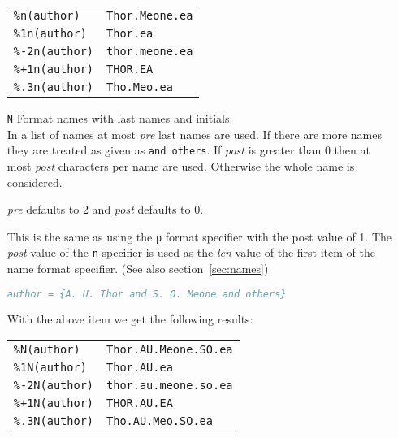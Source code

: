 \documentclass[11pt,a4paper]{scrbook}
\begin{document}
\begin{itemize}
\begin{Example}
      \begin{tabular}{ll}
        \texttt{\%n(author)}	& \texttt{Thor.Meone.ea}	\\
        \texttt{\%1n(author)}	& \texttt{Thor.ea}		\\
        \texttt{\%-2n(author)}	& \texttt{thor.meone.ea}	\\
        \texttt{\%+1n(author)}	& \texttt{THOR.EA}		\\
        \texttt{\%.3n(author)}	& \texttt{Tho.Meo.ea}		
      \end{tabular}
    \end{Example}

  \item [\texttt{N}] Format names with last names and 
    initials.\\
    In a list of names at most \textit{pre} last names are used. If there are
    more names they are treated as given as \texttt{and others}. If
    \textit{post} is greater than 0 then at most \textit{post} characters per
    name are used. Otherwise the whole name is considered.

    \textit{pre} defaults to 2 and \textit{post} defaults to 0.

    This is the same as using the \texttt{p} format specifier with the post
    value of 1. The \textit{post} value of the \texttt{n} specifier is used as
    the \textit{len} value of the first item of the name format specifier.
    (See also section~\ref{sec:names})

    \begin{Example}
      \begin{lstlisting}[language=BibTeX]
  author = {A. U. Thor and S. O. Meone and others}
      \end{lstlisting}\vspace{-2ex}
      With the above item we get the following results:
      
      \begin{tabular}{ll}
        \texttt{\%N(author)}	& \texttt{Thor.AU.Meone.SO.ea}	\\
        \texttt{\%1N(author)}	& \texttt{Thor.AU.ea}		\\
        \texttt{\%-2N(author)}	& \texttt{thor.au.meone.so.ea}	\\
        \texttt{\%+1N(author)}	& \texttt{THOR.AU.EA}		\\
        \texttt{\%.3N(author)}	& \texttt{Tho.AU.Meo.SO.ea}	
      \end{tabular}
    \end{Example}
    

\end{itemize}
\end{document}
